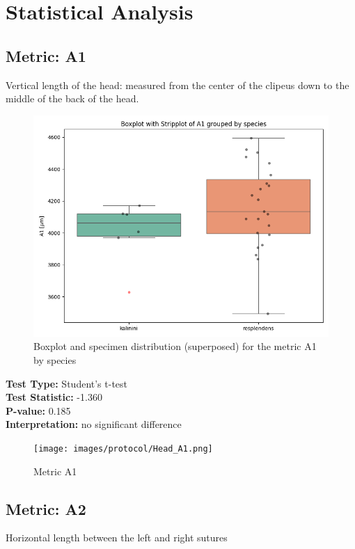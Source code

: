 \section{Statistical Analysis}

\subsection*{Metric: A1}

Vertical length of the head: measured from the center of the clipeus down to the middle of the back of the head.

\begin{figure}[H]
\centering
\includegraphics[width=0.7\linewidth]{images/boxplot/boxplot_A1.png}
\caption{  Boxplot and specimen distribution (superposed) for the metric  A1 by species}
\end{figure}

\noindent\textbf{Test Type:} Student's t-test \\
\noindent\textbf{Test Statistic:} -1.360 \\
\noindent\textbf{P-value:} 0.185 \\
\noindent\textbf{Interpretation:} no significant difference

\begin{figure}[H]
\centering
\texttt{[image: images/protocol/Head\_A1.png]}
\caption{ Metric A1}
\end{figure}

\newpage
\subsection*{Metric: A2}

Horizontal length between the left and right sutures

